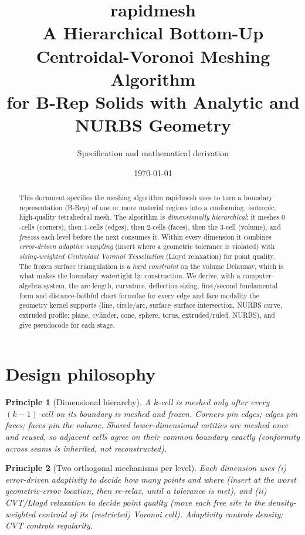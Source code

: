 \documentclass[11pt,a4paper]{article}
\title{\textbf{rapidmesh}\\[2pt]
\large A Hierarchical Bottom-Up Centroidal-Voronoi Meshing Algorithm\\
\large for B-Rep Solids with Analytic and NURBS Geometry}
\author{Specification and mathematical derivation}
\date{\today}
\numberwithin{equation}{section}
\newtheorem{principle}{Principle}[section]
\begin{document}
\maketitle

\begin{abstract}
This document specifies the meshing algorithm rapidmesh uses to turn a
boundary representation (B-Rep) of one or more material regions into a
conforming, isotropic, high-quality tetrahedral mesh. The algorithm is
\emph{dimensionally hierarchical}: it meshes $0$-cells (corners), then $1$-cells
(edges), then $2$-cells (faces), then the $3$-cell (volume), and \emph{freezes}
each level before the next consumes it. Within every dimension it combines
\emph{error-driven adaptive sampling} (insert where a geometric tolerance is
violated) with \emph{sizing-weighted Centroidal Voronoi Tessellation} (Lloyd
relaxation) for point quality. The frozen surface triangulation is a
\emph{hard constraint} on the volume Delaunay, which is what makes the boundary
watertight by construction. We derive, with a computer-algebra system, the
arc-length, curvature, deflection-sizing, first/second fundamental form and
distance-faithful chart formulae for every edge and face modality the geometry
kernel supports (line, circle/arc, surface--surface intersection, NURBS curve,
extruded profile; plane, cylinder, cone, sphere, torus, extruded/ruled, NURBS),
and give pseudocode for each stage.
\end{abstract}

\clearpage
\tableofcontents
\clearpage
\listoffigures
\clearpage
\listoftables
\clearpage

\section{Design philosophy}

\begin{principle}[Dimensional hierarchy]
A $k$-cell is meshed only after every $(k{-}1)$-cell on its boundary is meshed
and \emph{frozen}. Corners pin edges; edges pin faces; faces pin the volume.
Shared lower-dimensional entities are meshed once and reused, so adjacent
cells agree on their common boundary exactly (conformity across seams is
inherited, not reconstructed).
\end{principle}

\begin{principle}[Two orthogonal mechanisms per level]
Each dimension uses (i) \emph{error-driven adaptivity} to decide \emph{how many}
points and \emph{where} (insert at the worst geometric-error location, then
re-relax, until a tolerance is met), and (ii) \emph{CVT/Lloyd relaxation} to
decide \emph{point quality} (move each free site to the density-weighted
centroid of its (restricted) Voronoi cell). Adaptivity controls density;
CVT controls regularity.
\end{principle}
\end{document}
